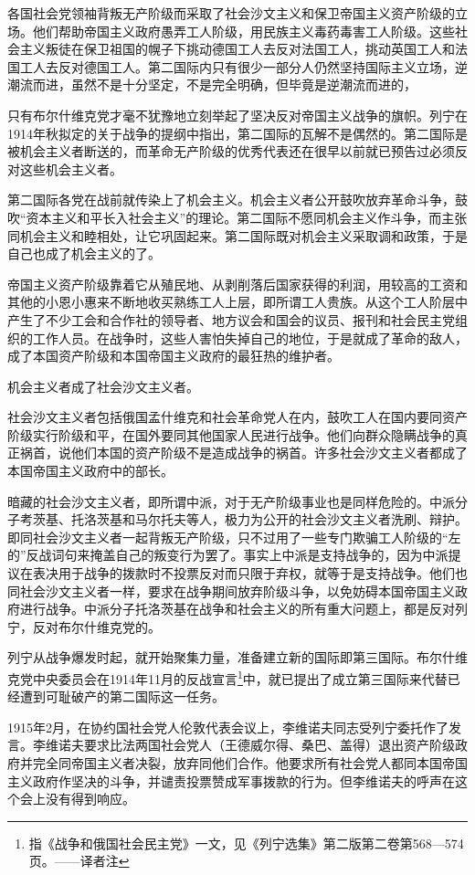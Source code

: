 各国社会党领袖背叛无产阶级而采取了社会沙文主义和保卫帝国主义资产阶级的立场。他们帮助帝国主义政府愚弄工人阶级，用民族主义毒药毒害工人阶级。这些社会主义叛徒在保卫祖国的幌子下挑动德国工人去反对法国工人，挑动英国工人和法国工人去反对德国工人。第二国际内只有很少一部分人仍然坚持国际主义立场，逆潮流而进，虽然不是十分坚定，不是完全明确，但毕竟是逆潮流而进的，

只有布尔什维克党才毫不犹豫地立刻举起了坚决反对帝国主义战争的旗帜。列宁在1914年秋拟定的关于战争的提纲中指出，第二国际的瓦解不是偶然的。第二国际是被机会主义者断送的，而革命无产阶级的优秀代表还在很早以前就已预告过必须反对这些机会主义者。

第二国际各党在战前就传染上了机会主义。机会主义者公开鼓吹放弃革命斗争，鼓吹“资本主义和平长入社会主义”的理论。第二国际不愿同机会主义作斗争，而主张同机会主义和睦相处，让它巩固起来。第二国际既对机会主义采取调和政策，于是自己也成了机会主义的了。

帝国主义资产阶级靠着它从殖民地、从剥削落后国家获得的利润，用较高的工资和其他的小恩小惠来不断地收买熟练工人上层，即所谓工人贵族。从这个工人阶层中产生了不少工会和合作社的领导者、地方议会和国会的议员、报刊和社会民主党组织的工作人员。在战争时，这些人害怕失掉自己的地位，于是就成了革命的敌人，成了本国资产阶级和本国帝国主义政府的最狂热的维护者。

机会主义者成了社会沙文主义者。

社会沙文主义者包括俄国孟什维克和社会革命党人在内，鼓吹工人在国内要同资产阶级实行阶级和平，在国外要同其他国家人民进行战争。他们向群众隐瞒战争的真正祸首，说他们本国的资产阶级不是造成战争的祸首。许多社会沙文主义者都成了本国帝国主义政府中的部长。

暗藏的社会沙文主义者，即所谓中派，对于无产阶级事业也是同样危险的。中派分子考茨基、托洛茨基和马尔托夫等人，极力为公开的社会沙文主义者洗刷、辩护。即同社会沙文主义者一起背叛无产阶级，只不过用了一些专门欺骗工人阶级的“左的”反战词句来掩盖自己的叛变行为罢了。事实上中派是支持战争的，因为中派提议在表决用于战争的拨款时不投票反对而只限于弃权，就等于是支持战争。他们也同社会沙文主义者一样，要求在战争期间放弃阶级斗争，以免妨碍本国帝国主义政府进行战争。中派分子托洛茨基在战争和社会主义的所有重大问题上，都是反对列宁，反对布尔什维克党的。

列宁从战争爆发时起，就开始聚集力量，准备建立新的国际即第三国际。布尔什维克党中央委员会在1914年11月的反战宣言\footnote{指《战争和俄国社会民主党》一文，见《列宁选集》第二版第二卷第568—574页。——译者注}中，就已提出了成立第三国际来代替已经遭到可耻破产的第二国际这一任务。

1915年2月，在协约国社会党人伦敦代表会议上，李维诺夫同志受列宁委托作了发言。李维诺夫要求比法两国社会党人（王德威尔得、桑巴、盖得）退出资产阶级政府并完全同帝国主义者决裂，放弃同他们合作。他要求所有社会党人都同本国帝国主义政府作坚决的斗争，并谴责投票赞成军事拨款的行为。但李维诺夫的呼声在这个会上没有得到响应。

